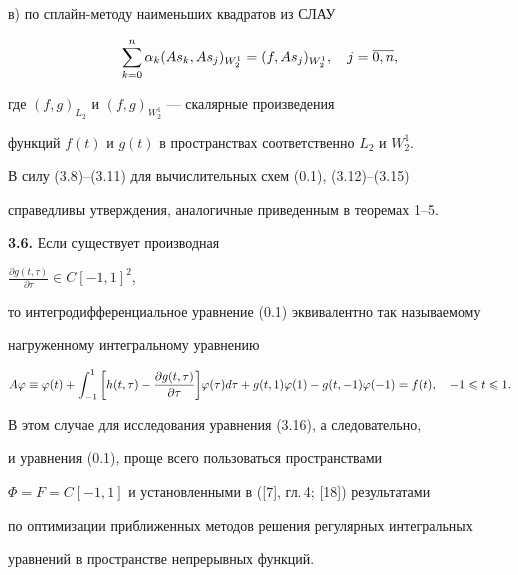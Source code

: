 в) по сплайн-методу наименьших квадратов из СЛАУ


\begin{equation}


\suml_{k=0}^n \alpha_k(As_k,As_j)_{W_2^1} = (f,As_j)_{W_2^1},


\quad j=\ol{0,n},


\end{equation}


где $(f,g)_{L_2}$ и $(f,g)_{W_2^1}$ --- скалярные произведения 


функций $f(t)$ и $g(t)$ в пространствах соответственно $L_2$ и $W_2^1$.





В силу (3.8)--(3.11) для вычислительных схем (0.1), (3.12)--(3.15) 


справедливы утверждения, аналогичные приведенным в теоремах 1--5.


\medskip





{\bf 3.6.} Если существует производная


$\frac{\partial g(t,\tau)}{\partial \tau}\in C[-1,1]^2$,


то интегродифференциальное уравнение (0.1) эквивалентно так называемому 


нагруженному интегральному уравнению


\begin{equation}


A\vp \equiv \vp(t)+\int_{-1}^1\bigg[h(t,\tau) -


\frac{\partial g(t,\tau)}{\partial \tau}\bigg]\vp(\tau)d\tau+


g(t,1)\vp(1) - g(t,-1)\vp(-1) = f(t),\quad -1\lea t \lea 1.


\end{equation}


В этом случае для исследования уравнения (3.16), а следовательно, 


и уравнения (0.1), проще всего пользоваться пространствами


$\Phi=F = C[-1,1]$ и установленными в ([7], гл.\,4; [18]) результатами 


по оптимизации приближенных методов решения регулярных интегральных 


уравнений в пространстве непрерывных функций.








